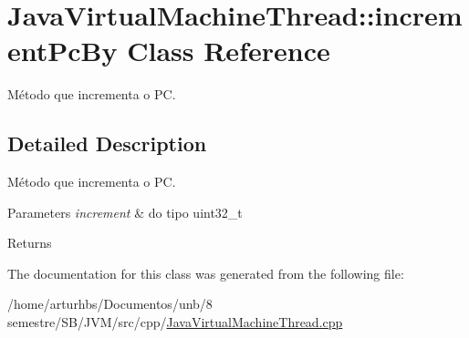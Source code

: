 \hypertarget{classJavaVirtualMachineThread_1_1incrementPcBy}{}\section{Java\+Virtual\+Machine\+Thread\+:\+:increment\+Pc\+By Class Reference}
\label{classJavaVirtualMachineThread_1_1incrementPcBy}


Método que incrementa o PC.  




\subsection{Detailed Description}
Método que incrementa o PC. 


\begin{DoxyParams}{Parameters}
{\em increment} & do tipo uint32\+\_\+t \\
\hline
\end{DoxyParams}
\begin{DoxyReturn}{Returns}

\end{DoxyReturn}


The documentation for this class was generated from the following file\+:\begin{DoxyCompactItemize}
\item 
/home/arturhbs/\+Documentos/unb/8 semestre/\+S\+B/\+J\+V\+M/src/cpp/\hyperlink{JavaVirtualMachineThread_8cpp}{Java\+Virtual\+Machine\+Thread.\+cpp}\end{DoxyCompactItemize}
